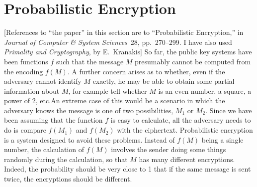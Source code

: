 \section{Probabilistic Encryption\label{pro}}
[References to ``the paper'' in this section are to ``Probabilistic
Encryption,'' in {\it Journal of Computer \& System Sciences\/}~28,
pp.~270--299. I have also used {\it Primality and Cryptography},
by E.~Kranakis]\pq
So far, the public key systems have been functions $f$ such that 
the message $M$ presumably cannot be computed from the encoding $f(M)$.
A further concern arises as to whether, even if the adversary cannot
identify $M$ exactly, he may be able to obtain some partial information
about $M$, for example tell whether $M$ is an even number, a square,
a power of 2, etc.\pq An extreme case of this would be a scenario
in which the adversary knows the message is one of two possibilities,
$M_1$ or $M_2$. Since we have been assuming that the function $f$ is
easy to calculate, all the adversary needs to do is compare $f(M_1)$ and
$f(M_2)$ with the ciphertext.
\pq Probabilistic encryption is a system designed to avoid these problems.
Instead of $f(M)$ being a single number, the calculation of $f(M)$ involves
the sender doing some things randomly during the calculation, so that $M$
has many different encryptions.  Indeed, the probability should be very
close to 1 that if the same message is sent twice, the encryptions should
be different.
